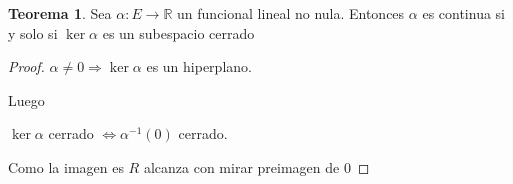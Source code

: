 \documentclass[12pt]{article}
\newcommand{\R}{\mathbb{R}}
\newcommand{\Ra}{\Rightarrow}
\newcommand{\ra}{\rightarrow}
\theoremstyle{definition}
\newtheorem{theorem}{Teorema}
\begin{document}
\begin{theorem}
  Sea $\alpha: E \ra \R$ un funcional lineal no nula. Entonces $\alpha$ es  continua si y solo si $\ker{\alpha} $ es un subespacio cerrado
\begin{proof}
  $\alpha \neq 0 \Ra \ker{\alpha}$ es un hiperplano. 

  Luego \begin{center} 
    $\ker{\alpha}$ cerrado $\iff \alpha^{-1}(0)$ cerrado. 
  \end{center}
    Como la imagen es $R$ alcanza con mirar preimagen de 0
  
\end{proof}

\end{theorem}
\end{document}
